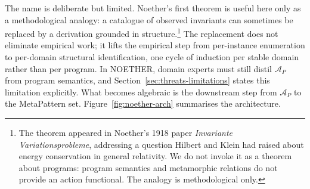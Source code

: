 \documentclass[manuscript]{acmart}
\begin{document}
The name is deliberate but limited. Noether's first theorem is useful here only as a methodological analogy: a catalogue of observed invariants can sometimes be replaced by a derivation grounded in structure.\footnote{The theorem appeared in Noether's 1918 paper \emph{Invariante Variationsprobleme}, addressing a question Hilbert and Klein had raised about energy conservation in general relativity. We do not invoke it as a theorem about programs: program semantics and metamorphic relations do not provide an action functional. The analogy is methodological only.} The replacement does not eliminate empirical work; it lifts the empirical step from per-instance enumeration to per-domain structural identification, one cycle of induction per stable domain rather than per program. In NOETHER, domain experts must still distil $\mathcal{A}_P$ from program semantics, and Section~\ref{sec:threats-limitations} states this limitation explicitly. What becomes algebraic is the downstream step from $\mathcal{A}_P$ to the MetaPattern set. Figure~\ref{fig:noether-arch} summarises the architecture.
\end{document}

